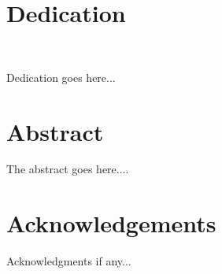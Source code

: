 \documentclass[12pt]{report}
\begin{document}
{}


\chapter*{Dedication}\

Dedication goes here... 


\chapter*{Abstract}

The abstract goes here....


\chapter*{Acknowledgements}

Acknowledgments if any...


\tableofcontents{}

\listoftables{}

\listoffigures{}



\thispagestyle{noheaderfooter}




















\appendix


\end{document}
